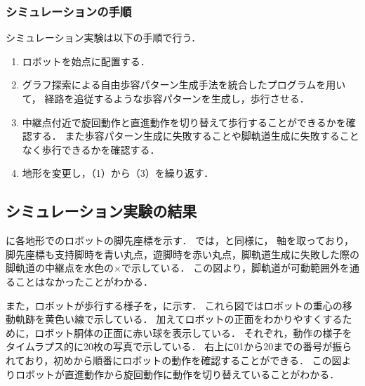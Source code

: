 \subsubsection{シミュレーションの手順}
シミュレーション実験は以下の手順で行う．

\begin{enumerate}
  \item ロボットを始点に配置する．
  \item グラフ探索による自由歩容パターン生成手法を統合したプログラムを用いて，
        経路を追従するような歩容パターンを生成し，歩行させる．
  \item 中継点付近で旋回動作と直進動作を切り替えて歩行することができるかを確認する．
  また歩容パターン生成に失敗することや脚軌道生成に失敗することなく歩行できるかを確認する．
  \item 地形を変更し，（1）から（3）を繰り返す．
\end{enumerate}


\subsection{シミュレーション実験の結果}
に各地形でのロボットの脚先座標を示す．
では，と同様に，
軸を取っており，脚先座標も支持脚時を青い丸点，遊脚時を赤い丸点，脚軌道生成に失敗した際の脚軌道の中継点を水色の$\times$で示している．
この図より，脚軌道が可動範囲外を通ることはなかったことがわかる．

また，ロボットが歩行する様子を，に示す．
これら図ではロボットの重心の移動軌跡を黄色い線で示している．
加えてロボットの正面をわかりやすくするために，ロボット胴体の正面に赤い球を表示している．
それぞれ，動作の様子をタイムラプス的に20枚の写真で示している．
右上に01から20までの番号が振られており，初めから順番にロボットの動作を確認することができる．
この図よりロボットが直進動作から旋回動作に動作を切り替えていることがわかる．

